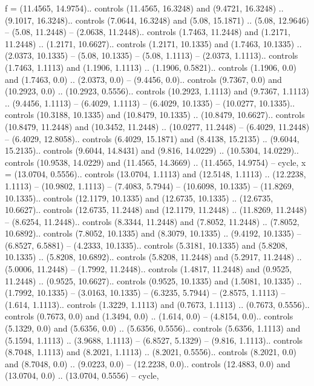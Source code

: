f = {(11.4565, 14.9754).. controls (11.4565, 16.3248) and (9.4721, 16.3248) .. (9.1017, 16.3248).. controls (7.0644, 16.3248) and (5.08, 15.1871) .. (5.08, 12.9646) -- (5.08, 11.2448) -- (2.0638, 11.2448).. controls (1.7463, 11.2448) and (1.2171, 11.2448) .. (1.2171, 10.6627).. controls (1.2171, 10.1335) and (1.7463, 10.1335) .. (2.0373, 10.1335) -- (5.08, 10.1335) -- (5.08, 1.1113) -- (2.0373, 1.1113).. controls (1.7463, 1.1113) and (1.1906, 1.1113) .. (1.1906, 0.5821).. controls (1.1906, 0.0) and (1.7463, 0.0) .. (2.0373, 0.0) -- (9.4456, 0.0).. controls (9.7367, 0.0) and (10.2923, 0.0) .. (10.2923, 0.5556).. controls (10.2923, 1.1113) and (9.7367, 1.1113) .. (9.4456, 1.1113) -- (6.4029, 1.1113) -- (6.4029, 10.1335) -- (10.0277, 10.1335).. controls (10.3188, 10.1335) and (10.8479, 10.1335) .. (10.8479, 10.6627).. controls (10.8479, 11.2448) and (10.3452, 11.2448) .. (10.0277, 11.2448) -- (6.4029, 11.2448) -- (6.4029, 12.8058).. controls (6.4029, 15.1871) and (8.4138, 15.2135) .. (9.6044, 15.2135).. controls (9.6044, 14.8431) and (9.816, 14.0229) .. (10.5304, 14.0229).. controls (10.9538, 14.0229) and (11.4565, 14.3669) .. (11.4565, 14.9754) -- cycle},
x = {(13.0704, 0.5556).. controls (13.0704, 1.1113) and (12.5148, 1.1113) .. (12.2238, 1.1113) -- (10.9802, 1.1113) -- (7.4083, 5.7944) -- (10.6098, 10.1335) -- (11.8269, 10.1335).. controls (12.1179, 10.1335) and (12.6735, 10.1335) .. (12.6735, 10.6627).. controls (12.6735, 11.2448) and (12.1179, 11.2448) .. (11.8269, 11.2448) -- (8.6254, 11.2448).. controls (8.3344, 11.2448) and (7.8052, 11.2448) .. (7.8052, 10.6892).. controls (7.8052, 10.1335) and (8.3079, 10.1335) .. (9.4192, 10.1335) -- (6.8527, 6.5881) -- (4.2333, 10.1335).. controls (5.3181, 10.1335) and (5.8208, 10.1335) .. (5.8208, 10.6892).. controls (5.8208, 11.2448) and (5.2917, 11.2448) .. (5.0006, 11.2448) -- (1.7992, 11.2448).. controls (1.4817, 11.2448) and (0.9525, 11.2448) .. (0.9525, 10.6627).. controls (0.9525, 10.1335) and (1.5081, 10.1335) .. (1.7992, 10.1335) -- (3.0163, 10.1335) -- (6.3235, 5.7944) -- (2.8575, 1.1113) -- (1.614, 1.1113).. controls (1.3229, 1.1113) and (0.7673, 1.1113) .. (0.7673, 0.5556).. controls (0.7673, 0.0) and (1.3494, 0.0) .. (1.614, 0.0) -- (4.8154, 0.0).. controls (5.1329, 0.0) and (5.6356, 0.0) .. (5.6356, 0.5556).. controls (5.6356, 1.1113) and (5.1594, 1.1113) .. (3.9688, 1.1113) -- (6.8527, 5.1329) -- (9.816, 1.1113).. controls (8.7048, 1.1113) and (8.2021, 1.1113) .. (8.2021, 0.5556).. controls (8.2021, 0.0) and (8.7048, 0.0) .. (9.0223, 0.0) -- (12.2238, 0.0).. controls (12.4883, 0.0) and (13.0704, 0.0) .. (13.0704, 0.5556) -- cycle},
